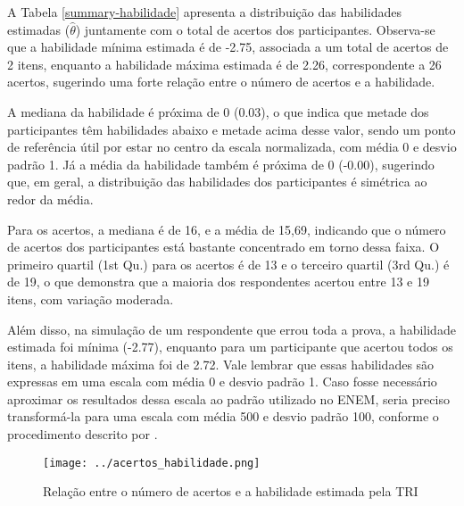 A Tabela \ref{summary-habilidade} apresenta a distribuição das habilidades estimadas ($\hat{\theta}$) juntamente com o total de acertos dos participantes. Observa-se que a habilidade mínima estimada é de -2.75, associada a um total de acertos de 2 itens, enquanto a habilidade máxima estimada é de 2.26, correspondente a 26 acertos, sugerindo uma forte relação entre o número de acertos e a habilidade.

A mediana da habilidade é próxima de 0 (0.03), o que indica que metade dos participantes têm habilidades abaixo e metade acima desse valor, sendo um ponto de referência útil por estar no centro da escala normalizada, com média 0 e desvio padrão 1. Já a média da habilidade também é próxima de 0 (-0.00), sugerindo que, em geral, a distribuição das habilidades dos participantes é simétrica ao redor da média.

Para os acertos, a mediana é de 16, e a média de 15,69, indicando que o número de acertos dos participantes está bastante concentrado em torno dessa faixa. O primeiro quartil (1st Qu.) para os acertos é de 13 e o terceiro quartil (3rd Qu.) é de 19, o que demonstra que a maioria dos respondentes acertou entre 13 e 19 itens, com variação moderada.

Além disso, na simulação de um respondente que errou toda a prova, a habilidade estimada foi mínima (-2.77), enquanto para um participante que acertou todos os itens, a habilidade máxima foi de 2.72. Vale lembrar que essas habilidades são expressas em uma escala com média 0 e desvio padrão 1. Caso fosse necessário aproximar os resultados dessa escala ao padrão utilizado no ENEM, seria preciso transformá-la para uma escala com média 500 e desvio padrão 100, conforme o procedimento descrito por .

\begin{table}[!hbt]
\end{table}




\begin{figure}[H]
	\centering
	\texttt{[image: ../acertos\_habilidade.png]}
	\caption{Relação entre o número de acertos e a habilidade estimada pela TRI}
	\label{fig:acertos_habilidade}
\end{figure}
